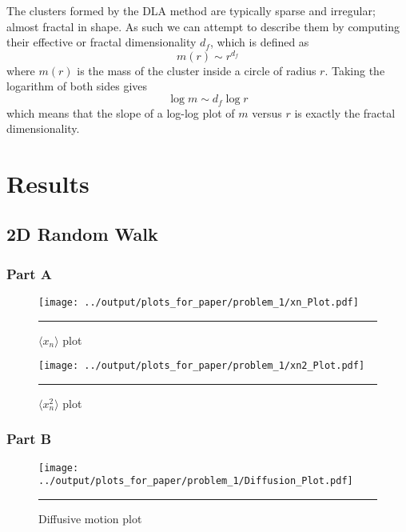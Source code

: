 \documentclass[notitlepage,aps,prd,nofootinbib]{revtex4-1}
\begin{document}
The clusters formed by the DLA method are typically sparse and irregular; almost fractal in shape. As such we can attempt to describe them by computing their effective or fractal dimensionality $d_f$, which is defined as
\begin{equation}
m(r)\sim r^{d_f}
\end{equation}
where $m(r)$ is the mass of the cluster inside a circle of radius $r$. Taking the logarithm of both sides gives
\begin{equation}
\log m \sim d_f \log r
\end{equation}
which means that the slope of a log-log plot of $m$ versus $r$ is exactly the fractal dimensionality.



\clearpage
\section{Results}
\label{sec:results}
\subsection{2D Random Walk}
\subsubsection{Part A}
\begin{figure}[!htbc]
  \centering
  \texttt{[image: ../output/plots\_for\_paper/problem\_1/xn\_Plot.pdf]}
  	{\par\nobreak\rule[9pt]{35em}{0.5pt}\vspace{-5mm}}
	\caption{$\langle x_{n} \rangle$ plot}
	\label{fig:1_a_1}
  \texttt{[image: ../output/plots\_for\_paper/problem\_1/xn2\_Plot.pdf]}
  	{\par\nobreak\rule[9pt]{35em}{0.5pt}\vspace{-5mm}}
	\caption{$\langle x_{n}^{2} \rangle$ plot}
	\label{fig:1_a_2}
\end{figure}

\newpage

\subsubsection{Part B}
\begin{figure}[!htbc]
  \centering
  \texttt{[image: ../output/plots\_for\_paper/problem\_1/Diffusion\_Plot.pdf]}
  	{\par\nobreak\rule[9pt]{35em}{0.5pt}\vspace{-5mm}}
	\caption{Diffusive motion plot}
	\label{fig:1_b}
\end{figure}
\end{document}
